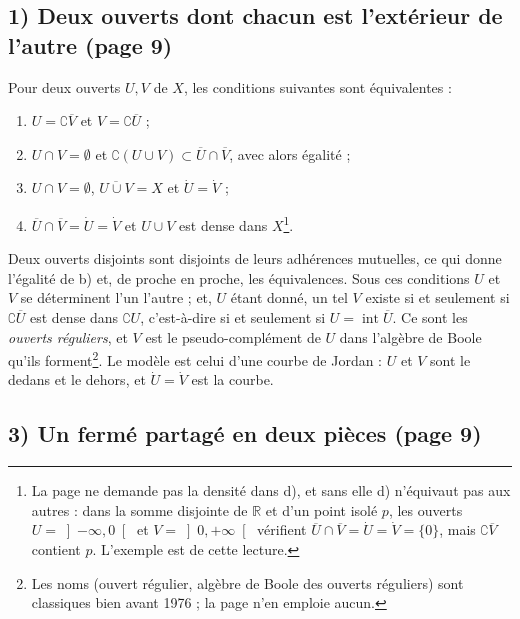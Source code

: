 \documentclass[11pt,a4paper]{article}
\begin{document}
\subsection*{1) Deux ouverts dont chacun est l'extérieur de l'autre (page 9)}

Pour deux ouverts $U, V$ de $X$, les conditions suivantes sont équivalentes :
\begin{enumerate}
  \item[a)] $U = \complement \overline{V}$ et $V = \complement \overline{U}$ ;
  \item[b)] $U \cap V = \emptyset$ et $\complement(U \cup V) \subset
    \overline{U} \cap \overline{V}$, avec alors égalité ;
  \item[c)] $U \cap V = \emptyset$, $\overline{U \cup V} = X$ et $\dot{U} =
    \dot{V}$ ;
  \item[d)] $\overline{U} \cap \overline{V} = \dot{U} = \dot{V}$ et $U \cup V$
    est dense dans $X$\footnote{La page ne demande pas la densité dans d), et
    sans elle d) n'équivaut pas aux autres : dans la somme disjointe de
    $\mathbb{R}$ et d'un point isolé $p$, les ouverts $U = \left]-\infty,
    0\right[$ et $V = \left]0, +\infty\right[$ vérifient $\overline{U} \cap
    \overline{V} = \dot{U} = \dot{V} = \{0\}$, mais $\complement\overline{V}$
    contient $p$. L'exemple est de cette lecture.}.
\end{enumerate}
Deux ouverts disjoints sont disjoints de leurs adhérences mutuelles, ce qui
donne l'égalité de b) et, de proche en proche, les équivalences. Sous ces
conditions $U$ et $V$ se déterminent l'un l'autre ; et, $U$ étant donné, un
tel $V$ existe si et seulement si $\complement \overline{U}$ est dense dans
$\complement U$, c'est-à-dire si et seulement si $U = \operatorname{int}
\overline{U}$. Ce sont les \emph{ouverts réguliers}, et $V$ est le
pseudo-complément de $U$ dans l'algèbre de Boole qu'ils forment\footnote{Les
noms (ouvert régulier, algèbre de Boole des ouverts réguliers) sont classiques
bien avant 1976 ; la page n'en emploie aucun.}. Le modèle est celui d'une
courbe de Jordan : $U$ et $V$ sont le dedans et le dehors, et $\dot{U} =
\dot{V}$ est la courbe.

\subsection*{3) Un fermé partagé en deux pièces (page 9)}
\end{document}
